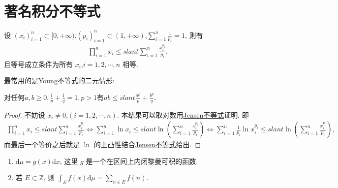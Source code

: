 \documentclass[../../main.tex]{subfiles}
\begin{document}
\section{著名积分不等式}

\begin{theorem}[Young不等式初等形式]\label{theorem:Young不等式初等形式}
设 $(x_i)_{i = 1}^n \subset [0, +\infty)$,$(p_i)_{i = 1}^n \subset (1, +\infty)$,$\sum_{i = 1}^n \frac{1}{p_i} = 1$, 则有
\begin{align*}
\prod_{i = 1}^n x_i \leqslant slant \sum_{i = 1}^n \frac{x_i^{p_i}}{p_i}.
\end{align*}
且等号成立条件为所有 $x_i$,$i = 1,2,\cdots,n$ 相等.
\end{theorem}
\begin{note}
最常用的是Young不等式的二元情形:

对任何$a,b\geqslant 0,\frac{1}{p}+\frac{1}{q}=1,p>1$有$ab\leqslant slant \frac{a^p}{p}+\frac{b^q}{q}.$
\end{note}
\begin{proof}
不妨设 $x_i \neq 0$,$(i = 1,2,\cdots,n)$. 本结果可以取对数用\hyperref[theorem:Jensen不等式1111]{Jensen不等式}证明, 即
\begin{align*}
\prod_{i = 1}^n x_i \leqslant slant \sum_{i = 1}^n \frac{x_i^{p_i}}{p_i}\Leftrightarrow \sum_{i = 1}^n \ln x_i \leqslant slant \ln \left(\sum_{i = 1}^n \frac{x_i^{p_i}}{p_i}\right) \Leftrightarrow \sum_{i = 1}^n \frac{1}{p_i} \ln x_i^{p_i} \leqslant slant \ln \left(\sum_{i = 1}^n \frac{x_i^{p_i}}{p_i}\right),
\end{align*}
而最后一个等价之后就是 $\ln$ 的上凸性结合\hyperref[theorem:Jensen不等式1111]{Jensen不等式}给出.
\end{proof}

\begin{definition}
\begin{enumerate}[(1)]
\item $\mathrm{d}\mu = g(x)\mathrm{d}x$, 这里 $g$ 是一个在区间上内闭黎曼可积的函数.
\item 若 $E \subset \mathbb{Z}$, 则 $\int_E f(x) \mathrm{d}\mu = \sum_{n \in E} f(n)$.
\end{enumerate}
\end{definition}
\end{document}
